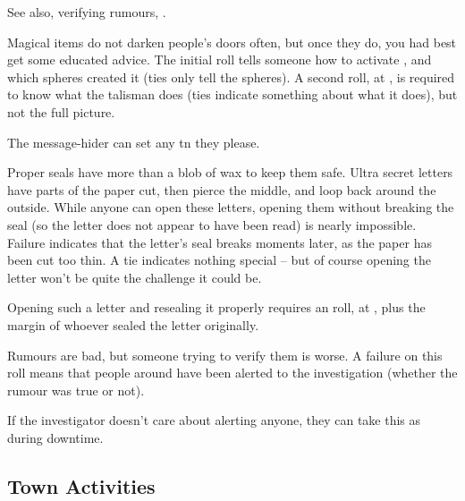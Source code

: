 \begin{multicols}{2}
See also, verifying rumours, .

Magical items do not darken people's doors often, but once they do, you had best get some educated advice.
The initial roll tells someone how to activate , and which \glspl{sphere} created it (ties only tell the \glspl{sphere}).
A second roll, at \tn[14], is required to know what the \gls{talisman} does (ties indicate something about what it does), but not the full picture.


The message-hider can set any \gls{tn} they please.

Proper seals have more than a blob of wax to keep them safe.
Ultra secret letters have parts of the paper cut, then pierce the middle, and loop back around the outside.
While anyone can open these letters, opening them without breaking the seal (so the letter does not appear to have been read) is nearly impossible.
Failure indicates that the letter's seal breaks moments later, as the paper has been cut too thin.
A tie indicates nothing special -- but of course opening the letter won't be quite the challenge it could be.

Opening such a letter and resealing it properly requires an  roll, at \tn[14], plus the margin of whoever sealed the letter originally.

Rumours are bad, but someone trying to verify them is worse.
A failure on this roll means that people around have been alerted to the investigation (whether the rumour was true or not).

If the investigator doesn't care about alerting anyone, they can take this as  during \gls{downtime}.

\subsection{Town Activities}


\end{multicols}
